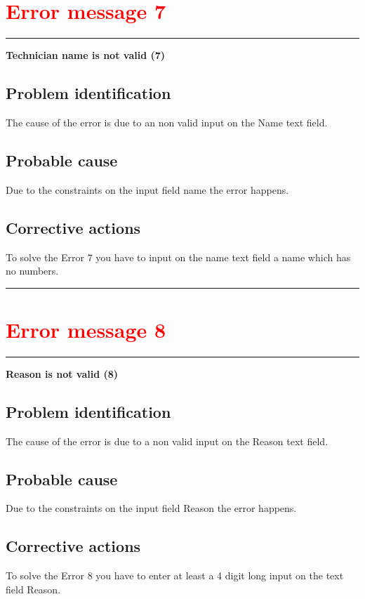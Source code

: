 \section{\textbf{\textcolor{red}{Error message 7}}}
\hrule
\vspace{0.5cm}
\textbf{Technician name is not valid (7)}

\subsection{Problem identification}
The cause of the error is due to an non valid input on the Name text field.

\subsection{Probable cause}
Due to the constraints on the input field name the error happens.

\subsection{Corrective actions}
To solve the Error 7 you have to input on the name text field a name which has
no numbers.

\vspace{0.5cm}
\hrule
\break

\section{\textbf{\textcolor{red}{Error message 8}}}
\hrule
\vspace{0.5cm}
\textbf{Reason is not valid (8)}
\subsection{Problem identification}
The cause of the error is due to a non valid input on the Reason text field.

\subsection{Probable cause}
Due to the constraints on the input field Reason the error happens.

\subsection{Corrective actions}
To solve the Error 8 you have to enter at least a 4 digit long input on the text
field Reason.

